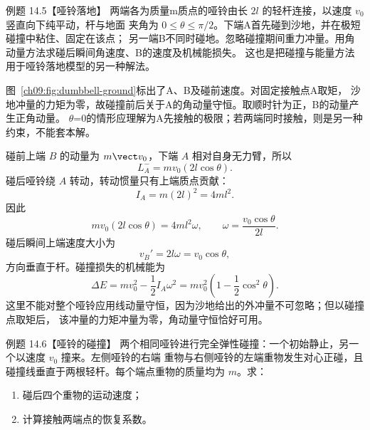 \Needspace{0.38\textheight}
\begin{origexamplebox}{例题 14.5【哑铃落地】}
两端各为质量m质点的哑铃由长 $2l$ 的轻杆连接，以速度 $v_0$ 竖直向下纯平动，杆与地面
夹角为 $0\le\theta\le\pi/2$。下端A首先碰到沙地，并在极短碰撞中粘住、固定在该点；
另一端B不同时碰地。忽略碰撞期间重力冲量。用角动量方法求碰后瞬间角速度、B的速度及机械能损失。
这也是把碰撞与能量方法用于哑铃落地模型的另一种解法。
\dumbbellGroundDiagram
\end{origexamplebox}

\begin{xesolution}
图~\ref{ch09:fig:dumbbell-ground}标出了A、B及碰前速度。对固定接触点A取矩，
沙地冲量的力矩为零，故碰撞前后关于A的角动量守恒。取顺时针为正，B的动量产生正角动量。
$\theta$=0的情形应理解为A先接触的极限；若两端同时接触，则是另一种约束，不能套本解。

碰前上端 $B$ 的动量为 $m\vect v_0$，下端 $A$ 相对自身无力臂，所以
\[
 L_A^-=m v_0(2l\cos\theta).
\]
碰后哑铃绕 $A$ 转动，转动惯量只有上端质点贡献：
\[
 I_A=m(2l)^2=4ml^2.
\]
因此
\[
 m v_0(2l\cos\theta)=4ml^2\omega,
 \qquad
 \boxed{\omega=\frac{v_0\cos\theta}{2l}}.
\]
碰后瞬间上端速度大小为
\[
 \boxed{v_B'=2l\omega=v_0\cos\theta},
\]
方向垂直于杆。碰撞损失的机械能为
\[
 \Delta E
 =mv_0^2-\frac12I_A\omega^2
 =\boxed{mv_0^2\left(1-\frac12\cos^2\theta\right)}.
\]
这里不能对整个哑铃应用线动量守恒，因为沙地给出的外冲量不可忽略；但以碰撞点取矩后，
该冲量的力矩冲量为零，角动量守恒恰好可用。
\end{xesolution}

\Needspace{0.40\textheight}
\begin{origexamplebox}{例题 14.6【哑铃的碰撞】}
两个相同哑铃进行完全弹性碰撞：一个初始静止，另一个以速度 $v_0$ 撞来。左侧哑铃的右端
重物与右侧哑铃的左端重物发生对心正碰，且碰撞线垂直于两根轻杆。每个端点重物的质量均为
$m$。求：
\begin{enumerate}[label=(\arabic*),leftmargin=2.2em]
  \item 碰后四个重物的运动速度；
  \item 计算接触两端点的恢复系数。
\end{enumerate}
\dumbbellCollisionDiagram
\end{origexamplebox}

